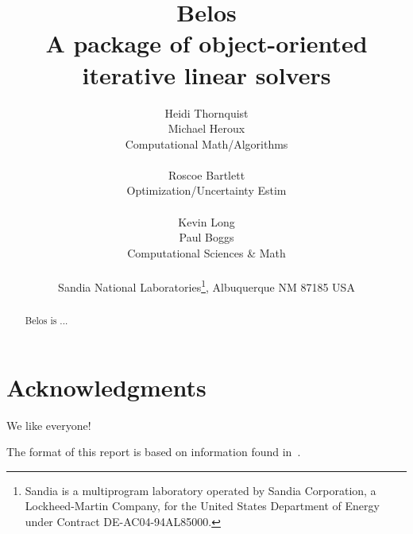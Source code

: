 \documentclass[pdf,ps2pdf,11pt]{SANDreport}
\title{
{\Huge\bf Belos}\\[1.5ex] A package of object-oriented iterative
linear solvers }
\author{
Heidi Thornquist \\
Michael Heroux \\
Computational Math/Algorithms \\ \\
Roscoe Bartlett \\
Optimization/Uncertainty Estim \\ \\
Kevin Long \\
Paul Boggs \\
Computational Sciences \& Math \\ \\
Sandia National Laboratories\footnote{
Sandia is a multiprogram laboratory operated by Sandia Corporation, a
Lockheed-Martin Company, for the United States Department of Energy
under Contract DE-AC04-94AL85000.}, Albuquerque NM 87185 USA
}
\date{}
\begin{document}
\maketitle

%

%
\begin{abstract}
%
Belos is ...
%
\end{abstract}
%

%
\clearpage
\section*{Acknowledgments}
We like everyone!

The format of this report is based on information found
in~\cite{Sand98-0730}.

%
\clearpage
\tableofcontents
\listoffigures


\end{document}

